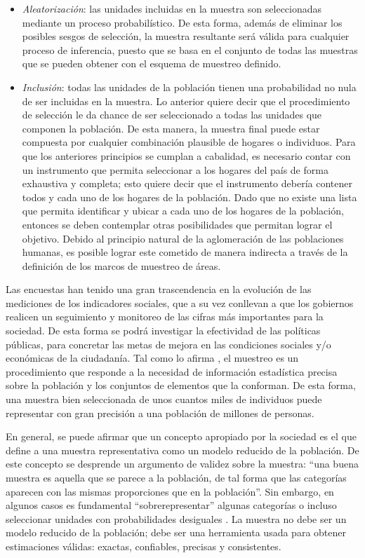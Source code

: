 \documentclass[
  12pt,
]{book}
\providecommand{\tightlist}{%
  \setlength{\itemsep}{0pt}\setlength{\parskip}{0pt}}
\begin{document}
\begin{itemize}
\tightlist
\item
  \emph{Aleatorización}: las unidades incluidas en la muestra son seleccionadas mediante un proceso probabilístico. De esta forma, además de eliminar los posibles sesgos de selección, la muestra resultante será válida para cualquier proceso de inferencia, puesto que se basa en el conjunto de todas las muestras que se pueden obtener con el esquema de muestreo definido.
\item
  \emph{Inclusión}: todas las unidades de la población tienen una probabilidad no nula de ser incluidas en la muestra. Lo anterior quiere decir que el procedimiento de selección le da chance de ser seleccionado a todas las unidades que componen la población. De esta manera, la muestra final puede estar compuesta por cualquier combinación plausible de hogares o individuos.
  Para que los anteriores principios se cumplan a cabalidad, es necesario contar con un instrumento que permita seleccionar a los hogares del país de forma exhaustiva y completa; esto quiere decir que el instrumento debería contener todos y cada uno de los hogares de la población. Dado que no existe una lista que permita identificar y ubicar a cada uno de los hogares de la población, entonces se deben contemplar otras posibilidades que permitan lograr el objetivo. Debido al principio natural de la aglomeración de las poblaciones humanas, es posible lograr este cometido de manera indirecta a través de la definición de los marcos de muestreo de áreas.
\end{itemize}

Las encuestas han tenido una gran trascendencia en la evolución de las mediciones de los indicadores sociales, que a su vez conllevan a que los gobiernos realicen un seguimiento y monitoreo de las cifras más importantes para la sociedad. De esta forma se podrá investigar la efectividad de las políticas públicas, para concretar las metas de mejora en las condiciones sociales y/o económicas de la ciudadanía. Tal como lo afirma \citet{Gutierrez_2016}, el muestreo es un procedimiento que responde a la necesidad de información estadística precisa sobre la población y los conjuntos de elementos que la conforman. De esta forma, una muestra bien seleccionada de unos cuantos miles de individuos puede representar con gran precisión a una población de millones de personas.

En general, se puede afirmar que un concepto apropiado por la sociedad es el que define a una muestra representativa como un modelo reducido de la población. De este concepto se desprende un argumento de validez sobre la muestra: ``una buena muestra es aquella que se parece a la población, de tal forma que las categorías aparecen con las mismas proporciones que en la población''. Sin embargo, en algunos casos es fundamental ``sobrerepresentar'' algunas categorías o incluso seleccionar unidades con probabilidades desiguales \citep{Tille2006}. La muestra no debe ser un modelo reducido de la población; debe ser una herramienta usada para obtener estimaciones válidas: exactas, confiables, precisas y consistentes.
\end{document}

